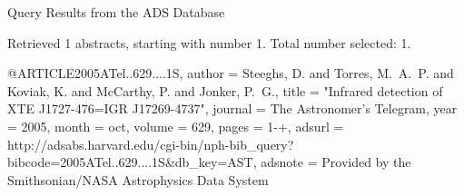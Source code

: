 Query Results from the ADS Database


Retrieved 1 abstracts, starting with number 1.  Total number selected: 1.

@ARTICLE{2005ATel..629....1S,
   author = {{Steeghs}, D. and {Torres}, M.~A.~P. and {Koviak}, K. and {McCarthy}, P. and 
	{Jonker}, P.~G.},
    title = "{Infrared detection of XTE J1727-476=IGR J17269-4737}",
  journal = {The Astronomer's Telegram},
     year = 2005,
    month = oct,
   volume = 629,
    pages = {1-+},
   adsurl = {http://adsabs.harvard.edu/cgi-bin/nph-bib_query?bibcode=2005ATel..629....1S&db_key=AST},
  adsnote = {Provided by the Smithsonian/NASA Astrophysics Data System}
}


